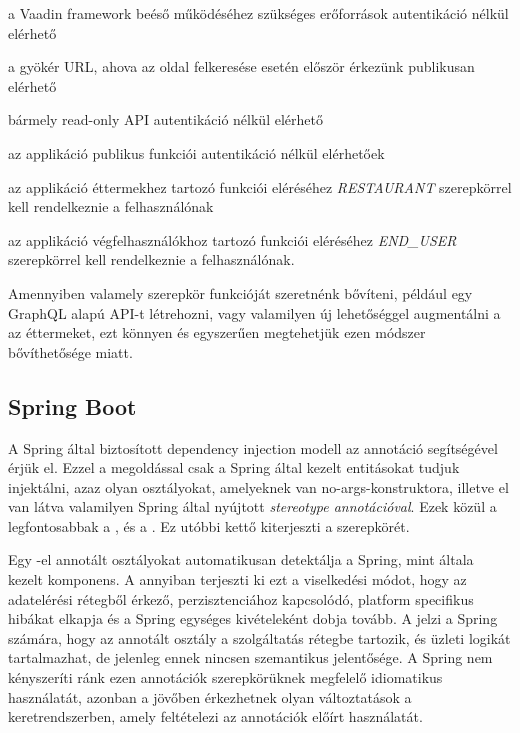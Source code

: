 \begin{listing}
	\item a Vaadin framework beéső működéséhez szükséges erőforrások autentikáció nélkül elérhető
	\item a gyökér URL, ahova az oldal felkeresése esetén először érkezünk publikusan elérhető
	\item bármely read-only API autentikáció nélkül elérhető
	\item az applikáció publikus funkciói autentikáció nélkül elérhetőek
	\item az applikáció éttermekhez tartozó funkciói eléréséhez \emph{RESTAURANT} szerepkörrel kell rendelkeznie a felhasználónak
	\item az applikáció végfelhasználókhoz tartozó funkciói eléréséhez \emph{END\_USER} szerepkörrel kell rendelkeznie a felhasználónak.
\end{listing} \par

Amennyiben valamely szerepkör funkcióját szeretnénk bővíteni, például egy GraphQL alapú API-t létrehozni, vagy valamilyen új lehetőséggel augmentálni a az éttermeket, ezt könnyen és egyszerűen megtehetjük ezen módszer bővíthetősége miatt. \par

\subsection{Spring Boot}

A Spring által biztosított dependency injection modell az  annotáció segítségével érjük el. Ezzel a megoldással csak a Spring által kezelt entitásokat tudjuk injektálni, azaz olyan osztályokat, amelyeknek van no-args-konstruktora, illetve el van látva valamilyen Spring által nyújtott \emph{stereotype annotációval}. Ezek közül a legfontosabbak a ,  és a . Ez utóbbi kettő kiterjeszti a  szerepkörét. \par

Egy -el annotált osztályokat automatikusan detektálja a Spring, mint általa kezelt komponens. A  annyiban terjeszti ki ezt a viselkedési módot, hogy az adatelérési rétegből érkező, perzisztenciához kapcsolódó, platform specifikus hibákat elkapja és a Spring egységes kivételeként dobja tovább. A  jelzi a Spring számára, hogy az annotált osztály a szolgáltatás rétegbe tartozik, és üzleti logikát tartalmazhat, de jelenleg ennek nincsen szemantikus jelentősége. A Spring nem kényszeríti ránk ezen annotációk szerepkörüknek megfelelő idiomatikus használatát, azonban a jövőben érkezhetnek olyan változtatások a keretrendszerben, amely feltételezi az annotációk előírt használatát. \par

